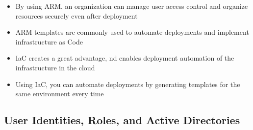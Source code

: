 \documentclass[11pt]{scrartcl}
\begin{document}
\begin{itemize}
\begin{itemize}
		\item By using ARM, an organization can manage user access control and organize resources securely even after deployment
		\item ARM templates are commonly used to automate deployments and implement infrastructure as Code
		\item IaC creates a great advantage, nd enables deployment automation of the infrastructure in the cloud
		\item Using IaC, you can automate deployments by generating templates for the same environment every time
	\end{itemize}
\end{itemize}
	
	
\subsection*{User Identities, Roles, and Active Directories}
\end{document}
